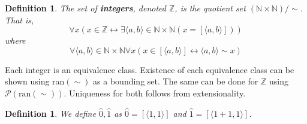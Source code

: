 \documentclass{report}
\newtheorem{definition}[theo]{Definition}
\begin{document}
\begin{definition}
The set of \textbf{integers}, denoted $\mathbb Z$, is the quotient set $(\mathbb N\times\mathbb N)/\sim$. That is,
\begin{equation*}
\forall x(x\in\mathbb Z\leftrightarrow\exists\langle a,b\rangle\in\mathbb N\times\mathbb N(x=[\langle a,b\rangle]))
\end{equation*}
where
\begin{equation*}
\forall\langle a,b\rangle\in\mathbb N\times\mathbb N\forall x(x\in[\langle a,b\rangle]\leftrightarrow\langle a,b\rangle\sim x)
\end{equation*}
\end{definition}
\noindent Each integer is an equivalence class. 
Existence of each equivalence class can be shown using ran$(\sim)$ as a bounding set. The same can be done for $\mathbb Z$ using $\mathscr P(\text{ran}(\sim))$.
Uniqueness for both follows from extensionality. 
\begin{definition}
We define $\hat 0,\hat 1$ as $\hat 0=[\langle 1,1\rangle]$ and $\hat 1=[\langle 1+1,1\rangle]$.
\end{definition}
\newpage
\end{document}

